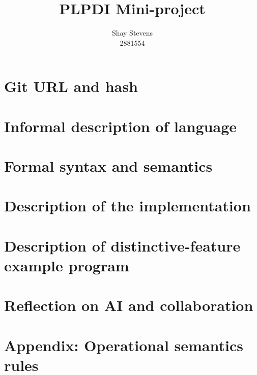 \documentclass{article}
\title{PLPDI Mini-project}
\author{Shay Stevens\\ 2881554}
\date{}
\begin{document}
\maketitle

\section{Git URL and hash}

\section{Informal description of language}

\section{Formal syntax and semantics}

\section{Description of the implementation}

\section{Description of distinctive-feature example program}

\section{Reflection on AI and collaboration}

\clearpage

\appendix

\section{Appendix: Operational semantics rules}
\end{document}

